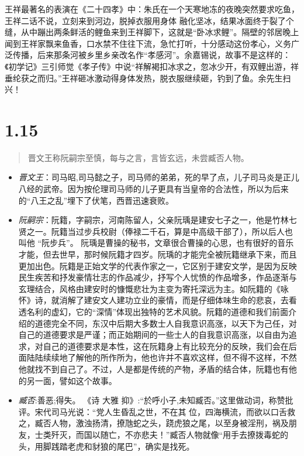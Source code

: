 \documentclass[]{book}
\providecommand{\tightlist}{%
  \setlength{\itemsep}{0pt}\setlength{\parskip}{0pt}}
\begin{document}
王祥最著名的表演在《二十四孝》中：朱氏在一个天寒地冻的夜晚突然要求吃鱼，王祥二话不说，立刻来到河边，脱掉衣服用身体
融化坚冰，结果冰面终于裂了个缝，从中蹦出两条鲜活的鲤鱼来到王祥脚下，这就是``卧冰求鲤''。隔壁的邻居晚上闻到王祥家飘来鱼香，口水禁不住往下流，急忙打听，十分感动这份孝心，义务广泛传播，后来那条河被乡里乡亲改名作``孝感河''。余嘉锡说，故事不是这样的：《初学记》三引师觉《孝子传》中说``祥解褐扣冰求之，忽冰少开，有双鲤出游，祥垂纶获之而归。''王祥砸冰激动得身体发热，脱衣服继续砸，钓到了鱼。余先生扫兴！

\section{1.15}\label{section-14}

\begin{quote}
晋文王称阮嗣宗至慎，每与之言，言皆玄远，未尝臧否人物。
\end{quote}

\begin{itemize}
\tightlist
\item
  \emph{晋文王}：司马昭,司马懿之子，司马师的弟弟，死的早了点，儿子司马炎是正儿八经的武帝。因为按伦理司马师的儿子更具有当皇帝的合法性，所以为后来的``八王之乱''埋下了伏笔，西晋迅速衰败。
\item
  \emph{阮嗣宗}：阮籍，字嗣宗，河南陈留人，父亲阮瑀是建安七子之一，他是竹林七贤之一。阮籍当过步兵校尉（俸禄二千石，算是中高级干部了），所以后人也叫他
  ``阮步兵''。
  阮瑀是曹操的秘书，文章很合曹操的心思，也有很好的音乐才能，但去世早，那时候阮籍才四岁。阮瑀的才能完全被阮籍继承下来，而且更加出色。阮籍是正始文学的代表作家之一，它区别于建安文学，是因为反映民生疾苦和抒发豪情壮志的作品减少，抒写个人忧愤的作品增多，作品逐渐与玄理结合，风格由建安时的慷慨悲壮为主变为寄托深远为主。如阮籍的《咏怀》诗，就消解了建安文人建功立业的豪情，而是仔细体味生命的悲哀，去看透名利的虚幻，它的``深情''体现出独特的艺术风貌。阮籍的道德和我们前面介绍的道德完全不同，东汉中后期大多数士人自我意识高涨，以天下为己任，对自己的道德要求是严谨；而正始期间的一些士人的自我意识高涨，以自由为追求，对自己的道德要求是本性，这在阮籍身上有比较充分的反映，我们会在后面陆陆续续地了解他的所作所为，他也许并不喜欢这样，但不得不这样，不然他就找不到自己了。不过，人是都是传统的产物，矛盾的结合体，阮籍也有他的另一面，譬如这个故事。
\item
  \emph{臧否}:善恶;得失。 《诗 大雅
  抑》:``於呼小子,未知臧否。''这里做动词，称赞批评。宋代司马光说：``党人生昏乱之世，不在其
  位，四海横流，而欲以口舌救之，臧否人物，激浊扬清，撩虺蛇之头，跷虎狼之尾，以至身被淫刑，祸及朋友，士类歼灭，而国以随亡，不亦悲夫！''臧否人物就像``用手去撩拨毒蛇的头，用脚践踏老虎和豺狼的尾巴''，确实是找死。
\end{itemize}
\end{document}
